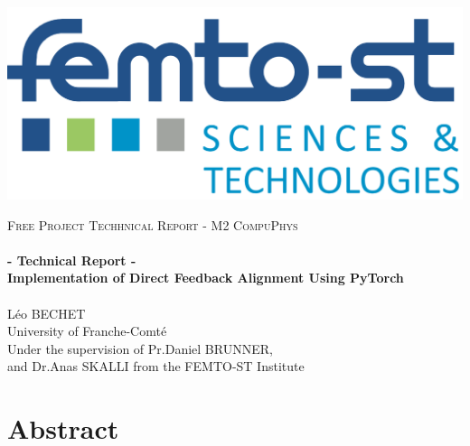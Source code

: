 \documentclass[english]{article}
\begin{document}
\begin{titlepage}
\begin{center}
        \hspace{1cm}
        \includegraphics[scale=0.04]{rsc/logos/femto.png}
        \hspace{1cm}
    \end{center}

    \vbox{ }

    \vbox{ }

    \begin{center}
                
        \textsc{\Large Free Project Techhnical Report - M2 CompuPhys}\\[1cm]

        \noindent\makebox[\linewidth]{\rule{.7\paperwidth}{.6pt}}\\[0.7cm]
        { \Huge \bfseries - Technical Report - \\ Implementation of Direct Feedback Alignment Using PyTorch}\\[0.25cm]
        \noindent\makebox[\linewidth]{\rule{.7\paperwidth}{.6pt}}\\[0.7cm]
        \LARGE{Léo BECHET}\\
        \small{University of Franche-Comté}\\[1.2cm]
        
        \vfill
        \large
        \Large{Under the supervision of Pr.Daniel BRUNNER,\\
        and Dr.Anas SKALLI from the FEMTO-ST Institute}

    \end{center}
\end{titlepage}

\newpage
\tableofcontents
\newpage

\section*{\centering \textbf{Abstract}}
\end{document}
